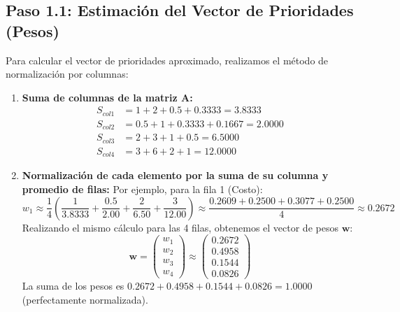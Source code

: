 \documentclass[11pt, letterpaper]{article}
\begin{document}
\subsection{Paso 1.1: Estimación del Vector de Prioridades (Pesos)}
Para calcular el vector de prioridades aproximado, realizamos el método de normalización por columnas:
\begin{enumerate}
    \item \textbf{Suma de columnas de la matriz $\mathbf{A}$:}
    \begin{align*}
        S_{col1} &= 1 + 2 + 0.5 + 0.3333 = 3.8333 \\
        S_{col2} &= 0.5 + 1 + 0.3333 + 0.1667 = 2.0000 \\
        S_{col3} &= 2 + 3 + 1 + 0.5 = 6.5000 \\
        S_{col4} &= 3 + 6 + 2 + 1 = 12.0000
    \end{align*}
    
    \item \textbf{Normalización de cada elemento por la suma de su columna y promedio de filas:}
    Por ejemplo, para la fila 1 (Costo):
    \begin{equation*}
        w_1 \approx \frac{1}{4} \left( \frac{1}{3.8333} + \frac{0.5}{2.00} + \frac{2}{6.50} + \frac{3}{12.00} \right) \approx \frac{0.2609 + 0.2500 + 0.3077 + 0.2500}{4} \approx 0.2672
    \end{equation*}
    Realizando el mismo cálculo para las 4 filas, obtenemos el vector de pesos $\mathbf{w}$:
    \begin{equation}
        \mathbf{w} = \begin{pmatrix} w_1 \\ w_2 \\ w_3 \\ w_4 \end{pmatrix} \approx \begin{pmatrix} 0.2672 \\ 0.4958 \\ 0.1544 \\ 0.0826 \end{pmatrix}
    \end{equation}
    La suma de los pesos es $0.2672 + 0.4958 + 0.1544 + 0.0826 = 1.0000$ (perfectamente normalizada).
\end{enumerate}
\end{document}
